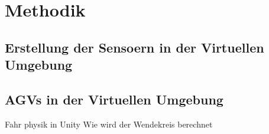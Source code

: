 \chapter{Methodik}

\section{Erstellung der Sensoern in der Virtuellen Umgebung}
\section{AGVs in der Virtuellen Umgebung}
Fahr physik in Unity
Wie wird der Wendekreis berechnet
